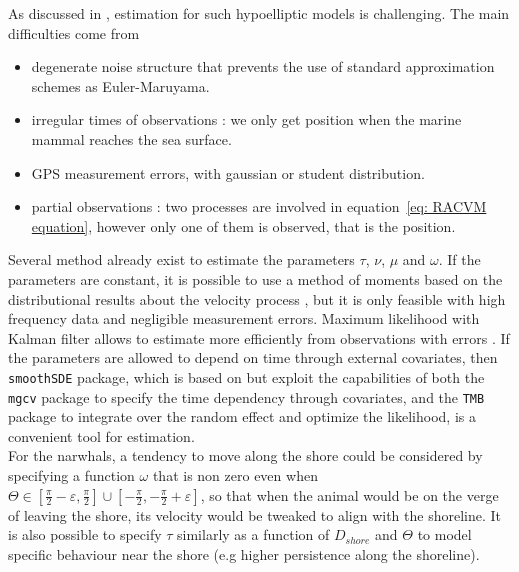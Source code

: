 \documentclass[11pt]{article}
\newcommand {\1}{\mathbb{1}}
\begin{document}
As discussed in \cite{ditlevsen_hypoelliptic_2019}, estimation for such hypoelliptic models is challenging. The main difficulties come from
\begin{itemize}
	\item degenerate noise structure that prevents the use of standard approximation schemes as Euler-Maruyama.
	\item irregular times of observations : we only get position when the marine mammal reaches the sea surface.
	\item GPS measurement errors, with gaussian or student distribution.
	\item partial observations : two processes are involved in equation~\ref{eq: RACVM equation}, however only one of them is observed, that is the position.
\end{itemize}
Several method already exist to estimate the parameters $\tau$, $\nu$, $\mu$ and $\omega$.
If the parameters are constant, it is possible to use a method of moments based on the distributional results about the velocity process \cite{gurarie_correlated_2017}, but it is only feasible with high frequency data and negligible measurement errors. Maximum likelihood with Kalman filter allows to estimate more efficiently from observations with errors \cite{johnson_continuoustime_2008}.
If the parameters are allowed to depend on time through external covariates, then \texttt{smoothSDE} package, which is based on \cite{johnson_continuoustime_2008} but exploit the capabilities of both the \texttt{mgcv} package \cite{wood_generalized_2017} to specify the time dependency through covariates, and the \texttt{TMB} \cite{kristensen_tmb_2016} package to integrate over the random effect and optimize the likelihood, is a convenient tool for estimation. \\


For the narwhals, a tendency to move along the shore could be considered by specifying a function $\omega$ that is non zero even when $\Theta \in \left[\frac{\pi}{2}-\varepsilon,\frac{\pi}{2}\right] \cup \left[-\frac{\pi}{2},-\frac{\pi}{2}+\varepsilon\right]$, so that when the animal would be on the verge of leaving the shore, its velocity would be tweaked to align with the shoreline. It is also possible  to specify $\tau$ similarly as a function of $D_{shore}$ and $\Theta$ to model specific behaviour near the shore (e.g higher persistence along the shoreline).

\newpage

\printbibliography
\end{document}
